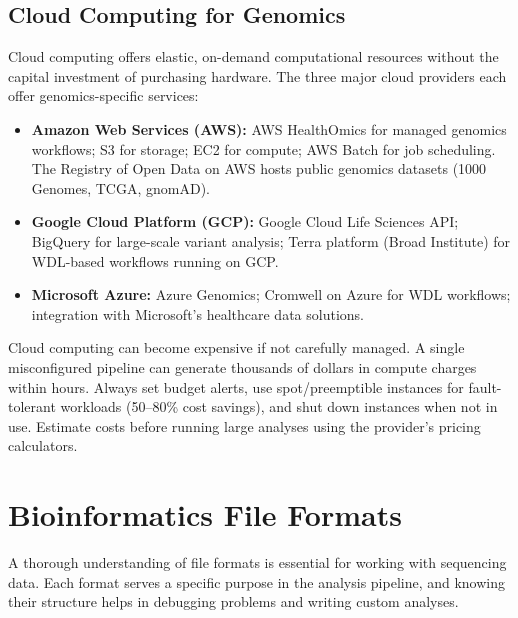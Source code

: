 \subsection{Cloud Computing for Genomics}
\label{subsec:bioinf:cloud}

Cloud computing offers elastic, on-demand computational resources without the capital investment of purchasing hardware. The three major cloud providers each offer genomics-specific services:

\begin{itemize}[itemsep=3pt]
  \item \textbf{Amazon Web Services (AWS):} AWS HealthOmics for managed genomics workflows; S3 for storage; EC2 for compute; AWS Batch for job scheduling. The Registry of Open Data on AWS hosts public genomics datasets (1000 Genomes, TCGA, gnomAD).
  \item \textbf{Google Cloud Platform (GCP):} Google Cloud Life Sciences API; BigQuery for large-scale variant analysis; Terra platform (Broad Institute) for WDL-based workflows running on GCP.
  \item \textbf{Microsoft Azure:} Azure Genomics; Cromwell on Azure for WDL workflows; integration with Microsoft's healthcare data solutions.
\end{itemize}

\begin{warningbox}[title={Cloud Cost Management}]
Cloud computing can become expensive if not carefully managed. A single misconfigured pipeline can generate thousands of dollars in compute charges within hours. Always set budget alerts, use spot/preemptible instances for fault-tolerant workloads (50--80\% cost savings), and shut down instances when not in use. Estimate costs before running large analyses using the provider's pricing calculators.
\end{warningbox}

\section{Bioinformatics File Formats}
\label{sec:bioinf:formats}

A thorough understanding of file formats is essential for working with sequencing data. Each format serves a specific purpose in the analysis pipeline, and knowing their structure helps in debugging problems and writing custom analyses.

